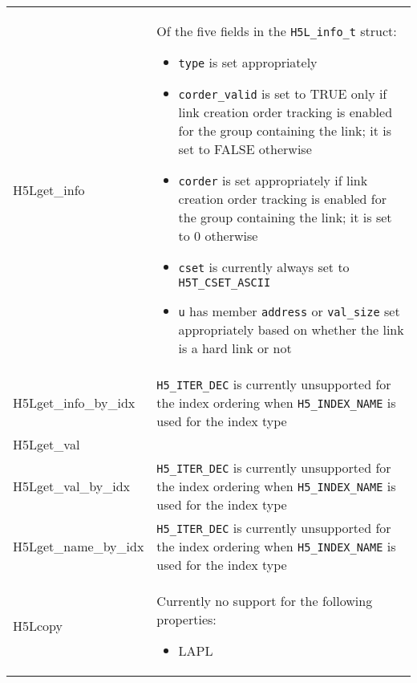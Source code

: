\documentclass[../users_guide.tex]{subfiles}
\begin{document}
\begin{center}
\begin{tabularx}{\linewidth}{| X | >{\RaggedRight}X |}
\end{tabularx}


\begin{tabularx}{\linewidth}{| X | >{\RaggedRight}X |}
\hline
\rowcolor{lightgray!50}%
\multicolumn{1}{| c |}{\textbf{API call}} & \multicolumn{1}{c |}{\textbf{Notes}} \\ \hline

H5Lget\_info & Of the five fields in the \texttt{H5L\_info\_t} struct:
                                     \begin{itemize}
                                         \item \texttt{type} is set appropriately
                                         \item \texttt{corder\_valid} is set to TRUE only if link creation order tracking is enabled for the group containing the link; it is set to FALSE otherwise
                                         \item \texttt{corder} is set appropriately if link creation order tracking is enabled for the group containing the link; it is set to 0 otherwise
                                         \item \texttt{cset} is currently always set to \texttt{H5T\_CSET\_ASCII}
                                         \item \texttt{u} has member \texttt{address} or \texttt{val\_size} set appropriately based on whether the link is a hard link or not
                                     \end{itemize}\\ \hline
H5Lget\_info\_by\_idx & \texttt{H5\_ITER\_DEC} is currently unsupported for the index ordering when \texttt{H5\_INDEX\_NAME} is used for the index type\\ \hline
H5Lget\_val & \\ \hline
H5Lget\_val\_by\_idx & \texttt{H5\_ITER\_DEC} is currently unsupported for the index ordering when \texttt{H5\_INDEX\_NAME} is used for the index type\\ \hline
H5Lget\_name\_by\_idx & \texttt{H5\_ITER\_DEC} is currently unsupported for the index ordering when \texttt{H5\_INDEX\_NAME} is used for the index type\\ \hline
H5Lcopy & Currently no support for the following properties:
\begin{itemize}
 \item LAPL

\end{itemize}
\end{tabularx}
\end{center}
\end{document}
